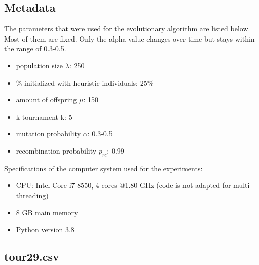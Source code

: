 \documentclass[a4paper,10pt]{article}
\newcommand{\ReplaceMe}[1]{{\color{blue}#1}}
\begin{document}
\subsection{Metadata}


The parameters that were used for the evolutionary algorithm are listed below. Most of them are fixed. Only the alpha value changes over time but stays within the range of 0.3-0.5.
\begin{itemize}
    \item population size $\lambda$: 250
    \item \% initialized with heuristic individuals: 25\%
    \item amount of offspring $\mu$: 150
    \item k-tournament k: 5
    \item mutation probability $\alpha$: 0.3-0.5
    \item recombination probability $p_{rc}$: 0.99
\end{itemize}
Specifications of the computer system used for the experiments:
\begin{itemize}
    \item CPU: Intel Core i7-8550, 4 cores @1.80 GHz (code is not adapted for multi-threading)
    \item 8 GB main memory
    \item Python version 3.8
\end{itemize}


\subsection{tour29.csv}

\end{document}
